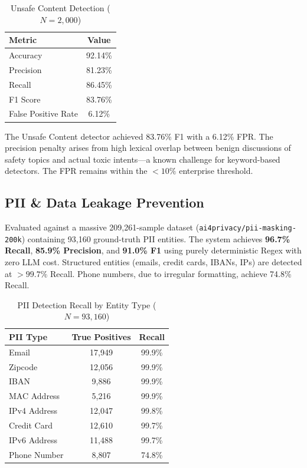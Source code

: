 \documentclass[conference]{IEEEtran}
\begin{document}
\begin{table}[htbp]
\centering
\caption{Unsafe Content Detection ($N{=}2{,}000$)}
\label{tab:unsafe}
\begin{tabular}{@{}lc@{}}
\toprule
\textbf{Metric} & \textbf{Value} \\
\midrule
Accuracy & 92.14\% \\
Precision & 81.23\% \\
Recall & 86.45\% \\
F1 Score & 83.76\% \\
False Positive Rate & 6.12\% \\
\bottomrule
\end{tabular}
\end{table}

The Unsafe Content detector achieved 83.76\% F1 with a 6.12\% FPR. The precision penalty arises from high lexical overlap between benign discussions of safety topics and actual toxic intents---a known challenge for keyword-based detectors. The FPR remains within the $<10\%$ enterprise threshold.

\subsection{PII \& Data Leakage Prevention}

Evaluated against a massive 209,261-sample dataset (\texttt{ai4privacy/pii-masking-200k}) containing 93,160 ground-truth PII entities. The system achieves \textbf{96.7\% Recall}, \textbf{85.9\% Precision}, and \textbf{91.0\% F1} using purely deterministic Regex with zero LLM cost. Structured entities (emails, credit cards, IBANs, IPs) are detected at $>99.7\%$ Recall. Phone numbers, due to irregular formatting, achieve 74.8\% Recall.

\begin{table}[htbp]
\centering
\caption{PII Detection Recall by Entity Type ($N{=}93{,}160$)}
\label{tab:pii_appendix}
\begin{tabular}{@{}lcc@{}}
\toprule
\textbf{PII Type} & \textbf{True Positives} & \textbf{Recall} \\
\midrule
Email & 17,949 & 99.9\% \\
Zipcode & 12,056 & 99.9\% \\
IBAN & 9,886 & 99.9\% \\
MAC Address & 5,216 & 99.9\% \\
IPv4 Address & 12,047 & 99.8\% \\
Credit Card & 12,610 & 99.7\% \\
IPv6 Address & 11,488 & 99.7\% \\
Phone Number & 8,807 & 74.8\% \\
\bottomrule
\end{tabular}
\end{table}
\end{document}
